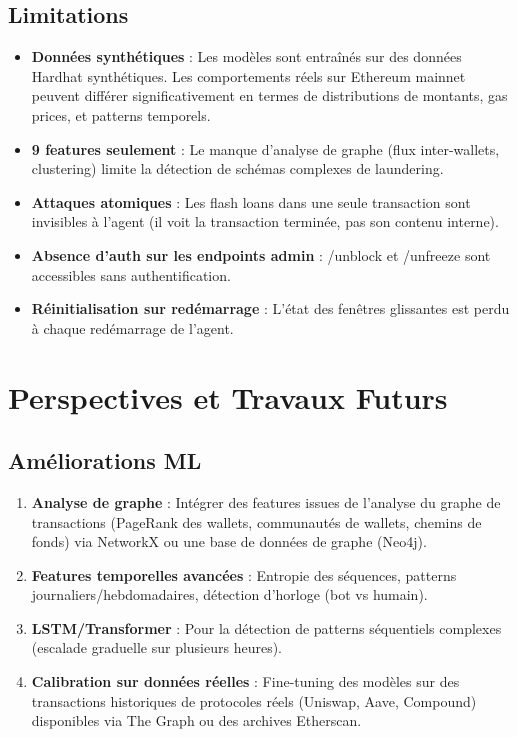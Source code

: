 \documentclass[12pt,a4paper]{report}
\begin{document}
\subsection{Limitations}

\begin{warningbox}
\begin{itemize}
  \item \textbf{Données synthétiques} : Les modèles sont entraînés sur des données Hardhat synthétiques. Les comportements réels sur Ethereum mainnet peuvent différer significativement en termes de distributions de montants, gas prices, et patterns temporels.
  \item \textbf{9 features seulement} : Le manque d'analyse de graphe (flux inter-wallets, clustering) limite la détection de schémas complexes de laundering.
  \item \textbf{Attaques atomiques} : Les flash loans dans une seule transaction sont invisibles à l'agent (il voit la transaction terminée, pas son contenu interne).
  \item \textbf{Absence d'auth sur les endpoints admin} : /unblock et /unfreeze sont accessibles sans authentification.
  \item \textbf{Réinitialisation sur redémarrage} : L'état des fenêtres glissantes est perdu à chaque redémarrage de l'agent.
\end{itemize}
\end{warningbox}

\section{Perspectives et Travaux Futurs}

\subsection{Améliorations ML}

\begin{enumerate}
  \item \textbf{Analyse de graphe} : Intégrer des features issues de l'analyse du graphe de transactions (PageRank des wallets, communautés de wallets, chemins de fonds) via NetworkX ou une base de données de graphe (Neo4j).
  \item \textbf{Features temporelles avancées} : Entropie des séquences, patterns journaliers/hebdomadaires, détection d'horloge (bot vs humain).
  \item \textbf{LSTM/Transformer} : Pour la détection de patterns séquentiels complexes (escalade graduelle sur plusieurs heures).
  \item \textbf{Calibration sur données réelles} : Fine-tuning des modèles sur des transactions historiques de protocoles réels (Uniswap, Aave, Compound) disponibles via The Graph ou des archives Etherscan.
\end{enumerate}
\end{document}
